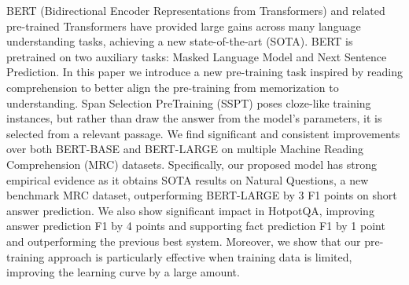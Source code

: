 BERT (Bidirectional Encoder Representations from Transformers) and related pre-trained Transformers have provided large gains across many language understanding tasks, achieving a new state-of-the-art (SOTA).  BERT is pretrained on two auxiliary tasks: Masked Language Model and Next Sentence Prediction.  In this paper we introduce a new pre-training task inspired by reading comprehension to better align the pre-training from memorization to understanding. Span Selection PreTraining (SSPT) poses cloze-like training instances, but rather than draw the answer from the model's parameters, it is selected from a relevant passage. We find significant and consistent improvements over both BERT-BASE and BERT-LARGE on multiple Machine Reading Comprehension (MRC) datasets. Specifically, our proposed model has strong empirical evidence as it obtains SOTA results on Natural Questions, a new benchmark MRC dataset, outperforming BERT-LARGE by 3 F1 points on short answer prediction. We also show significant impact in HotpotQA, improving answer prediction F1 by 4 points and supporting fact prediction F1 by 1 point and outperforming the previous best system. Moreover, we show that our pre-training approach is particularly effective when training data is limited, improving the learning curve by a large amount.
